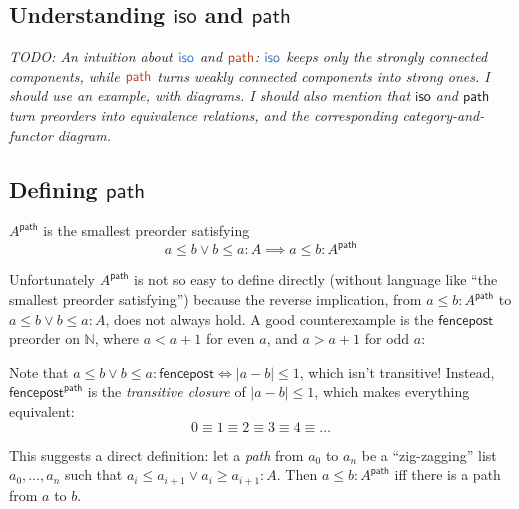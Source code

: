 \documentclass{rntz}
\newcommand{\todo}[1]{{\itshape\color{blue}#1}}
\newcommand{\ms}[1]{\ensuremath{\mathsf{#1}}}
\newcommand{\N}{\mathbb{N}}
\newcommand{\iso}{\ms{iso}}     %
\renewcommand{\path}{\ms{path}} %
\newcommand{\ti}{{\color{NavyBlue}\iso}}     %
\newcommand{\tb}{{\color{Bittersweet}\path}} %
\begin{document}
\subsection{Understanding \iso{} and \path{}}

\todo{TODO: An intuition about $\ti$ and $\tb$: $\ti$ keeps only the
  \emph{strongly connected components}, while $\tb$ turns \emph{weakly}
  connected components into \emph{strong} ones. I should use an example, with
  diagrams. I should also mention that \iso{} and \path{} turn preorders into
  equivalence relations, and the corresponding category-and-functor diagram.}

\subsection{Defining \path{}} \label{sec:defining-path}

$A^\path$ is the smallest preorder satisfying
\[ a \le b \vee b \le a : A \implies a \le b : A^\path \]

Unfortunately $A^\path$ is not so easy to define directly (without
language like ``the smallest preorder satisfying'')
%
because the reverse implication, from $a \le b : A^\path$ to $a \le b \vee b \le
a : A$, does not always hold. A good counterexample is the \ms{fencepost}
preorder on $\N$, where $a < a+1$ for even $a$, and $a > a+1$ for odd $a$:

\begin{center}
\end{center}

Note that $a \le b \vee b \le a : \ms{fencepost} \iff |a-b| \le 1$, which isn't
transitive! Instead, $\ms{fencepost}^\path$ is the \emph{transitive closure} of
$|a-b| \le 1$, which makes everything equivalent:
\[ 0 \equiv 1 \equiv 2 \equiv 3 \equiv 4 \equiv \dots \]

This suggests a direct definition: let a \emph{path} from $a_0$ to $a_n$ be a
``zig-zagging'' list $a_0, \dots, a_n$ such that $a_i \le a_{i+1} \vee a_i \ge
a_{i+1} : A$. Then $a \le b : A^\path$ iff there is a path from $a$ to $b$.
\end{document}
